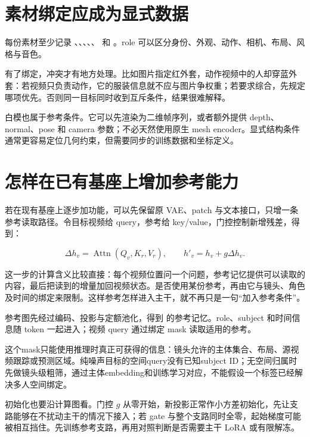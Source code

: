 \section{素材绑定应成为显式数据}\label{seedance-m07-ux7d20ux6750ux7ed1ux5b9aux5e94ux6210ux4e3aux663eux5f0fux6570ux636e}

每份素材至少记录 、、、、、 和 。role 可以区分身份、外观、动作、相机、布局、风格与音色。

有了绑定，冲突才有地方处理。比如图片指定红外套，动作视频中的人却穿蓝外套：若视频只负责动作，它的服装信息就不应与图片争权重；若要求综合，先规定哪项优先。否则同一目标同时收到互斥条件，结果很难解释。

白模也属于参考条件。它可以先渲染为二维帧序列，或者额外提供 depth、normal、pose 和 camera 参数；不必天然使用原生 mesh encoder。显式结构条件通常更容易定位几何约束，但需要同步的训练数据和坐标定义。

\section{怎样在已有基座上增加参考能力}\label{seedance-m07-ux600eux6837ux5728ux5df2ux6709ux57faux5ea7ux4e0aux589eux52a0ux53c2ux8003ux80fdux529b}

若在现有基座上逐步加功能，可以先保留原 VAE、patch 与文本接口，只增一条参考读取路径。令目标视频给 query，参考给 key/value，门控控制新增残差，得到：

\[
\Delta h_v=\operatorname{Attn}(Q_v,K_r,V_r),
\qquad h'_v=h_v+g\Delta h_v.
\]

这一步的计算含义比较直接：每个视频位置问一个问题，参考记忆提供可以读取的内容，最后把读到的增量加回视频状态。是否使用某份参考，再由它与镜头、角色及时间的绑定来限制。这样参考怎样进入主干，就不再只是一句“加入参考条件”。

参考图先经过编码、投影与定额池化，得到  的参考记忆。role、subject 和时间信息随 token 一起进入；视频 query 通过绑定 mask 读取适用的参考。

这个mask只能使用推理时真正可获得的信息：镜头允许的主体集合、布局、源视频跟踪或预测区域。纯噪声目标的空间query没有已知subject ID；无空间归属时先做镜头级粗筛，通过主体embedding和训练学习对应，不能假设一个标签已经解决多人空间绑定。

初始化也要沿计算图看。门控 \(g\) 从零开始，新投影正常作小方差初始化，先让支路能够在不扰动主干的情况下接入；若 gate 与整个支路同时全零，起始梯度可能被相互挡住。先训练参考支路，再用对照判断是否需要主干 LoRA 或有限解冻。

